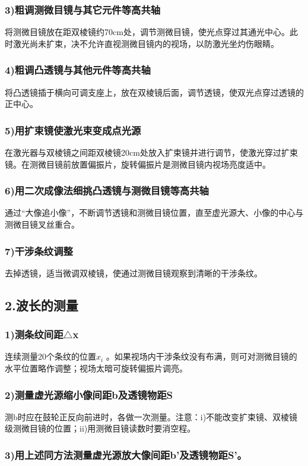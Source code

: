 \documentclass[11pt,a4paper,oneside]{article}
\begin{document}
\subsubsection*{3)粗调测微目镜与其它元件等高共轴}
将测微目镜放在距双棱镜约70cm处，调节测微目镜，使光点穿过其通光中心。此时激光尚未扩束，决不允许直视测微目镜内的视场，以防激光坐灼伤眼睛。
\subsubsection*{4)粗调凸透镜与其他元件等高共轴}
将凸透镜插于横向可调支座上，放在双棱镜后面，调节透镜，使双光点穿过透镜的正中心。
\subsubsection*{5)用扩束镜使激光束变成点光源}
在激光器与双棱镜之间距双棱镜20cm处放入扩束镜并进行调节，使激光穿过扩束镜。在测微目镜前放置偏振片，旋转偏振片是测微目镜内视场亮度适中。
\subsubsection*{6)用二次成像法细挑凸透镜与测微目镜等高共轴}
通过“大像追小像”，不断调节透镜和测微目镜位置，直至虚光源大、小像的中心与测微目镜叉丝重合。
\subsubsection*{7)干涉条纹调整}
去掉透镜，适当微调双棱镜，使通过测微目镜观察到清晰的干涉条纹。

\subsection*{2.波长的测量}
\subsubsection*{1)测条纹间距${\bigtriangleup}$x}
连续测量20个条纹的位置${x_i}$ 。如果视场内干涉条纹没有布满，则可对测微目镜的水平位置略作调整；视场太暗可旋转偏振片调亮。
\subsubsection*{2)测量虚光源缩小像间距b及透镜物距S}
测b时应在鼓轮正反向前进时，各做一次测量。注意：i)不能改变扩束镜、双棱镜级测微目镜的位置；ii)用测微目镜读数时要消空程。
\subsubsection*{3)用上述同方法测量虚光源放大像间距b’及透镜物距S’。}
\end{document}
